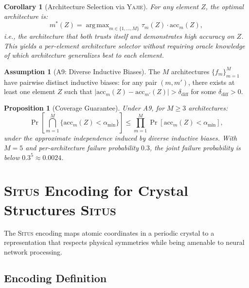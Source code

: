 \documentclass[11pt,a4paper]{article}
\newtheorem{proposition}[theorem]{Proposition}
\newtheorem{corollary}[theorem]{Corollary}
\theoremstyle{definition}
\newtheorem{assumption}[theorem]{Assumption}
\newcommand{\Situs}{\textsc{Situs}}
\newcommand{\Yajie}{\textsc{Yajie}}
\DeclareMathOperator*{\argmax}{arg\,max}
\begin{document}
\begin{corollary}[Architecture Selection via \Yajie{}]\label{cor:architecture_selection}
For any element $Z$, the optimal architecture is:
\begin{equation}
m^*(Z) = \argmax_{m \in \{1,\ldots,M\}} \tau_m(Z) \cdot \mathrm{acc}_m(Z),
\end{equation}
i.e., the architecture that both trusts itself and demonstrates high accuracy on $Z$. This yields a per-element architecture selector without requiring oracle knowledge of which architecture generalizes best to each element.
\end{corollary}

\begin{assumption}[A9: Diverse Inductive Biases]\label{ass:A9}
The $M$ architectures $\{f_m\}_{m=1}^M$ have pairwise distinct inductive biases: for any pair $(m, m')$, there exists at least one element $Z$ such that $|\mathrm{acc}_m(Z) - \mathrm{acc}_{m'}(Z)| > \delta_{\mathrm{diff}}$ for some $\delta_{\mathrm{diff}} > 0$.
\end{assumption}

\begin{proposition}[Coverage Guarantee]\label{prop:coverage}
Under A9, for $M \geq 3$ architectures:
\begin{equation}
\Pr\left[ \bigcap_{m=1}^M \{\mathrm{acc}_m(Z) < \alpha_{\min}\} \right] \leq \prod_{m=1}^M \Pr[\mathrm{acc}_m(Z) < \alpha_{\min}],
\end{equation}
under the approximate independence induced by diverse inductive biases. With $M = 5$ and per-architecture failure probability $0.3$, the joint failure probability is below $0.3^5 \approx 0.0024$.
\end{proposition}

\section{\Situs{} Encoding for Crystal Structures \Situs{}}
\label{sec:situs}

The \Situs{} encoding maps atomic coordinates in a periodic crystal to a representation that respects physical symmetries while being amenable to neural network processing.

\subsection{Encoding Definition}
\end{document}
